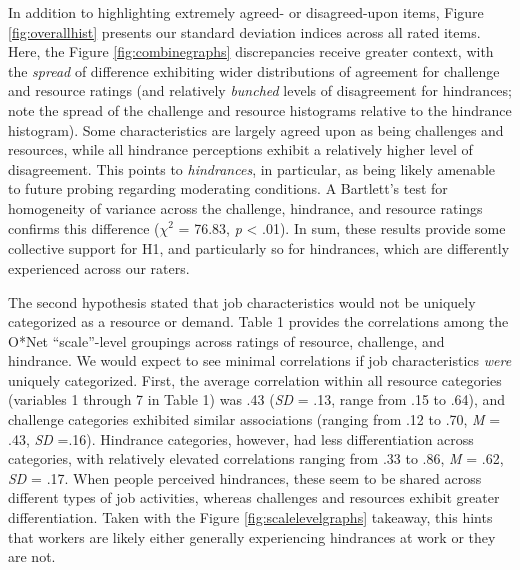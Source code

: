 \documentclass[
  jou,mask]{apa6}
\begin{document}
In addition to highlighting extremely agreed- or disagreed-upon items, Figure \ref{fig:overallhist} presents our standard deviation indices across all rated items. Here, the Figure \ref{fig:combinegraphs} discrepancies receive greater context, with the \emph{spread} of difference exhibiting wider distributions of agreement for challenge and resource ratings (and relatively \emph{bunched} levels of disagreement for hindrances; note the spread of the challenge and resource histograms relative to the hindrance histogram). Some characteristics are largely agreed upon as being challenges and resources, while all hindrance perceptions exhibit a relatively higher level of disagreement. This points to \emph{hindrances}, in particular, as being likely amenable to future probing regarding moderating conditions. A Bartlett's test for homogeneity of variance across the challenge, hindrance, and resource ratings confirms this difference (\(\chi^2_{}\) = 76.83, \emph{p} \textless{} .01). In sum, these results provide some collective support for H1, and particularly so for hindrances, which are differently experienced across our raters.

The second hypothesis stated that job characteristics would not be uniquely categorized as a resource or demand. Table 1 provides the correlations among the O*Net ``scale''-level groupings across ratings of resource, challenge, and hindrance. We would expect to see minimal correlations if job characteristics \emph{were} uniquely categorized. First, the average correlation within all resource categories (variables 1 through 7 in Table 1) was .43 (\emph{SD} = .13, range from .15 to .64), and challenge categories exhibited similar associations (ranging from .12 to .70, \emph{M} = .43, \emph{SD} =.16). Hindrance categories, however, had less differentiation across categories, with relatively elevated correlations ranging from .33 to .86, \emph{M} = .62, \emph{SD} = .17. When people perceived hindrances, these seem to be shared across different types of job activities, whereas challenges and resources exhibit greater differentiation. Taken with the Figure \ref{fig:scalelevelgraphs} takeaway, this hints that workers are likely either generally experiencing hindrances at work or they are not.
\end{document}
